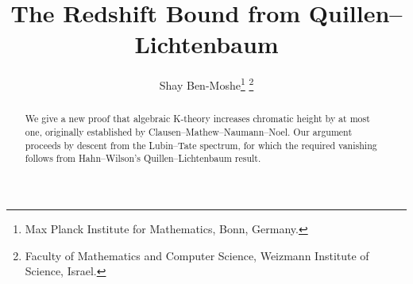 \documentclass{article}
\title{\vspace{-1.2em}The Redshift Bound from Quillen--Lichtenbaum}
\author{Shay Ben-Moshe\thanks{Max Planck Institute for Mathematics, Bonn, Germany.} \thanks{Faculty of Mathematics and Computer Science, Weizmann Institute of Science, Israel.}}
\date{}
\theoremstyle{definition}
\begin{document}
	\maketitle

	\vspace{-1.8em}
	
	\begin{abstract}
		We give a new proof that algebraic K-theory increases chromatic height by at most one, originally established by Clausen--Mathew--Naumann--Noel. Our argument proceeds by descent from the Lubin--Tate spectrum, for which the required vanishing follows from Hahn--Wilson's Quillen--Lichtenbaum result.
	\end{abstract}

	
	
	
	
	
	
	
\end{document}
